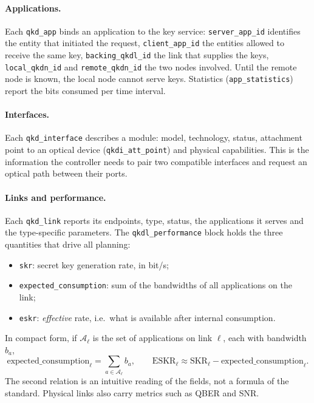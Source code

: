 \paragraph{Applications.}
Each \texttt{qkd\_app} binds an application to the key service:
\texttt{server\_app\_id} identifies the entity that initiated the request,
\texttt{client\_app\_id} the entities allowed to receive the same key,
\texttt{backing\_qkdl\_id} the link that supplies the keys,
\texttt{local\_qkdn\_id} and \texttt{remote\_qkdn\_id} the two nodes
involved. Until the remote node is known, the local node cannot serve keys.
Statistics (\texttt{app\_statistics}) report the bits consumed per time
interval.

\paragraph{Interfaces.}
Each \texttt{qkd\_interface} describes a module: model, technology, status,
attachment point to an optical device (\texttt{qkdi\_att\_point}) and
physical capabilities. This is the information the controller needs to
pair two compatible interfaces and request an optical path between their
ports.

\paragraph{Links and performance.}
Each \texttt{qkd\_link} reports its endpoints, type, status, the
applications it serves and the type-specific parameters. The
\texttt{qkdl\_performance} block holds the three quantities that drive all
planning:
\begin{itemize}
  \item \texttt{skr}: secret key generation rate, in bit/s;
  \item \texttt{expected\_consumption}: sum of the bandwidths of all
        applications on the link;
  \item \texttt{eskr}: \emph{effective} rate, i.e.\ what is available
        after internal consumption.
\end{itemize}
In compact form, if $\mathcal{A}_\ell$ is the set of applications on link
$\ell$, each with bandwidth $b_a$,
\begin{equation}
  \text{expected\_consumption}_\ell = \sum_{a\in\mathcal{A}_\ell} b_a ,
  \qquad
  \mathrm{ESKR}_\ell \approx \mathrm{SKR}_\ell - \text{expected\_consumption}_\ell .
  \label{eq:eskr015}
\end{equation}
The second relation is an intuitive reading of the fields, not a formula of
the standard. Physical links also carry metrics such as QBER and SNR.

